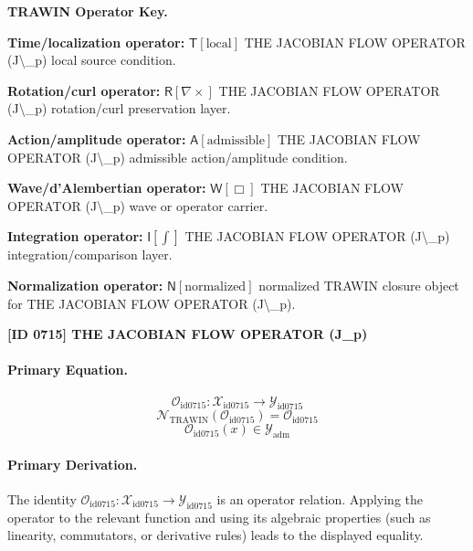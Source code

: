 \par\vspace{0.45\baselineskip}
\noindent\begin{minipage}[t]{\linewidth}
\begingroup
\small
\raggedright
\textbf{TRAWIN Operator Key.}\par
\noindent\textbf{Time/localization operator:} $\mathsf{T}\!\left[\mathrm{local}\right]$ THE JACOBIAN FLOW OPERATOR (J\textbackslash{}\_p) local source condition.\par
\noindent\textbf{Rotation/curl operator:} $\mathsf{R}\!\left[\nabla\times\right]$ THE JACOBIAN FLOW OPERATOR (J\textbackslash{}\_p) rotation/curl preservation layer.\par
\noindent\textbf{Action/amplitude operator:} $\mathsf{A}\!\left[\mathrm{admissible}\right]$ THE JACOBIAN FLOW OPERATOR (J\textbackslash{}\_p) admissible action/amplitude condition.\par
\noindent\textbf{Wave/d'Alembertian operator:} $\mathsf{W}\!\left[\Box\right]$ THE JACOBIAN FLOW OPERATOR (J\textbackslash{}\_p) wave or operator carrier.\par
\noindent\textbf{Integration operator:} $\mathsf{I}\!\left[\int\right]$ THE JACOBIAN FLOW OPERATOR (J\textbackslash{}\_p) integration/comparison layer.\par
\noindent\textbf{Normalization operator:} $\mathsf{N}\!\left[\mathrm{normalized}\right]$ normalized TRAWIN closure object for THE JACOBIAN FLOW OPERATOR (J\textbackslash{}\_p).\par
\endgroup
\end{minipage}

\clearpage
\noindent\textbf{[ID 0715] THE JACOBIAN FLOW OPERATOR (J\_p)}\par
\vspace{0.35em}
\paragraph{Primary Equation.}
\[
\mathcal{O}_{\mathrm{id0715}}:\mathcal{X}_{\mathrm{id0715}}\longrightarrow\mathcal{Y}_{\mathrm{id0715}}
\]
\[
\mathcal{N}_{\mathrm{TRAWIN}}(\mathcal{O}_{\mathrm{id0715}})=\mathcal{O}_{\mathrm{id0715}}
\]
\[
\mathcal{O}_{\mathrm{id0715}}(x)\in\mathcal{Y}_{\mathrm{adm}}
\]

\paragraph{Primary Derivation.}
The identity \( \mathcal{O}_{\mathrm{id0715}}:\mathcal{X}_{\mathrm{id0715}}\longrightarrow\mathcal{Y}_{\mathrm{id0715}} \) is an operator relation. Applying the operator to the relevant function and using its algebraic properties (such as linearity, commutators, or derivative rules) leads to the displayed equality.
